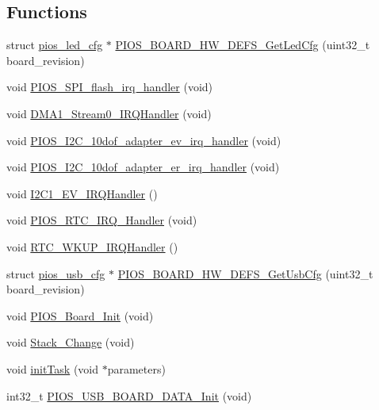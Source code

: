 \subsection*{\-Functions}
\begin{DoxyCompactItemize}
\item 
struct \hyperlink{structpios__led__cfg}{pios\-\_\-led\-\_\-cfg} $\ast$ \hyperlink{group___flying_f4_gafb76ae90816003eabf1d90feff7b1a52}{\-P\-I\-O\-S\-\_\-\-B\-O\-A\-R\-D\-\_\-\-H\-W\-\_\-\-D\-E\-F\-S\-\_\-\-Get\-Led\-Cfg} (uint32\-\_\-t board\-\_\-revision)
\item 
void \hyperlink{group___flying_f4_ga9105498d0634ecb94bb3a816f4fe28c9}{\-P\-I\-O\-S\-\_\-\-S\-P\-I\-\_\-flash\-\_\-irq\-\_\-handler} (void)
\item 
void \hyperlink{group___flying_f4_ga1b70a4441662b1d6548e803499da414f}{\-D\-M\-A1\-\_\-\-Stream0\-\_\-\-I\-R\-Q\-Handler} (void)
\item 
void \hyperlink{group___flying_f4_ga0f03dbdd2a8a9b7de8ef6e42fa91093f}{\-P\-I\-O\-S\-\_\-\-I2\-C\-\_\-10dof\-\_\-adapter\-\_\-ev\-\_\-irq\-\_\-handler} (void)
\item 
void \hyperlink{group___flying_f4_ga245e12ed29ff61941148ff421d7fe788}{\-P\-I\-O\-S\-\_\-\-I2\-C\-\_\-10dof\-\_\-adapter\-\_\-er\-\_\-irq\-\_\-handler} (void)
\item 
void \hyperlink{group___flying_f4_gad0e17b57fe51ed2861178f06899345c0}{\-I2\-C1\-\_\-\-E\-V\-\_\-\-I\-R\-Q\-Handler} ()
\item 
void \hyperlink{group___flying_f4_gadc73bf2eccd9d9ff9d8efedd1e743704}{\-P\-I\-O\-S\-\_\-\-R\-T\-C\-\_\-\-I\-R\-Q\-\_\-\-Handler} (void)
\item 
void \hyperlink{group___flying_f4_ga7e78266985c97f3b7e8a9f91893657d1}{\-R\-T\-C\-\_\-\-W\-K\-U\-P\-\_\-\-I\-R\-Q\-Handler} ()
\item 
struct \hyperlink{structpios__usb__cfg}{pios\-\_\-usb\-\_\-cfg} $\ast$ \hyperlink{group___flying_f4_ga9075152ece4596f99329ba0bc3866dc9}{\-P\-I\-O\-S\-\_\-\-B\-O\-A\-R\-D\-\_\-\-H\-W\-\_\-\-D\-E\-F\-S\-\_\-\-Get\-Usb\-Cfg} (uint32\-\_\-t board\-\_\-revision)
\item 
void \hyperlink{group___flying_f4_ga902009c5b1cb57d9f9d60092eb7cacfb}{\-P\-I\-O\-S\-\_\-\-Board\-\_\-\-Init} (void)
\item 
void \hyperlink{group___flying_f4_ga7a789e7b91612099a4a1f355b9e97c24}{\-Stack\-\_\-\-Change} (void)
\item 
void \hyperlink{group___flying_f4_gae7ecc4ed0ea5858477b78acaf928c3ef}{init\-Task} (void $\ast$parameters)
\item 
int32\-\_\-t \hyperlink{group___flying_f4_ga5efd94ab761f254827f38dba474cf642}{\-P\-I\-O\-S\-\_\-\-U\-S\-B\-\_\-\-B\-O\-A\-R\-D\-\_\-\-D\-A\-T\-A\-\_\-\-Init} (void)
\end{DoxyCompactItemize}
